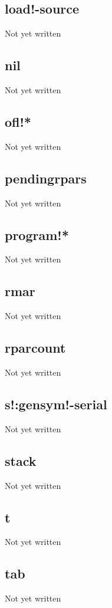 \documentclass[a4paper,11pt]{article}
\begin{document}
\subsection{\ttfamily load!-source}
Not yet written

\subsection{\ttfamily nil}
Not yet written

\subsection{\ttfamily ofl!*}
Not yet written

\subsection{\ttfamily pendingrpars}
Not yet written

\subsection{\ttfamily program!*}
Not yet written

\subsection{\ttfamily rmar}
Not yet written

\subsection{\ttfamily rparcount}
Not yet written

\subsection{\ttfamily s!:gensym!-serial}
Not yet written

\subsection{\ttfamily stack}
Not yet written

\subsection{\ttfamily t}
Not yet written

\subsection{\ttfamily tab}
Not yet written
\end{document}
